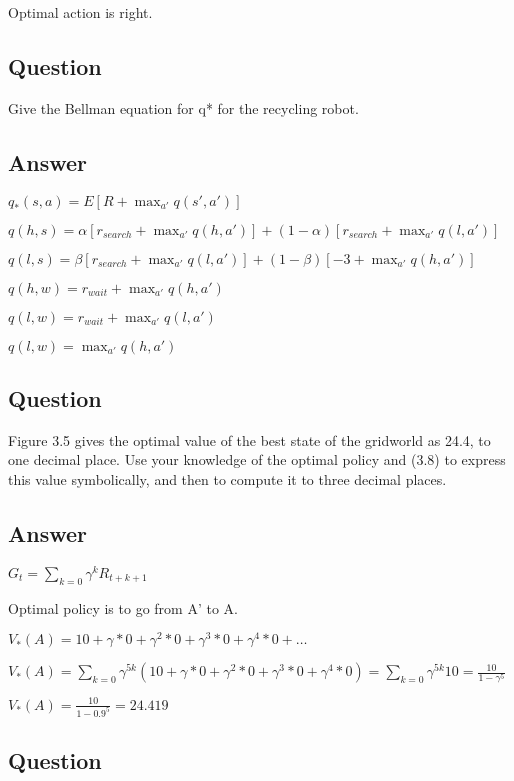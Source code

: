 \documentclass[11pt]{article}
\begin{document}
    Optimal action is right.

    \subsection{Question}

    Give the Bellman equation for q* for the recycling robot.

    \subsection*{Answer}

    $ q_{*}(s, a) = E[R + \max_{a'} q(s',a') ] $

    $ q(h, s) = \alpha [r_{search} + \max_{a'} q(h,a')] + (1-\alpha) [r_{search} + \max_{a'} q(l,a') ]  $

    $ q(l, s) = \beta [r_{search} + \max_{a'} q(l,a')] + (1-\beta) [-3 + \max_{a'} q(h,a') ]  $

    $ q(h, w) = r_{wait} + \max_{a'} q(h,a') $

    $ q(l, w) = r_{wait} + \max_{a'} q(l,a') $

    $ q(l, w) = \max_{a'} q(h,a') $

    \subsection{Question}

    Figure 3.5 gives the optimal value of the best state of the gridworld as 24.4, to one decimal place.
    Use your knowledge of the optimal policy and (3.8) to express this value symbolically, and then to compute it to three decimal places.

    \subsection*{Answer}

    $G_{t} = \sum_{k=0} \gamma ^ {k} R_{t+k+1} $

    Optimal policy is to go from A' to A.

    $V_{*}(A) = 10 + \gamma*0 + \gamma^{2}*0 + \gamma^{3}*0 + \gamma^{4}*0 + \dots $

    $V_{*}(A) = \sum_{k=0} \gamma^{5k} (10 + \gamma*0 + \gamma^{2}*0 + \gamma^{3}*0 + \gamma^{4}*0) = \sum_{k=0} \gamma^{5k} 10 = \frac{10}{1-\gamma^5}$

    $V_{*}(A) = \frac{10}{1-0.9^5} = 24.419 $

    \subsection{Question}
\end{document}
